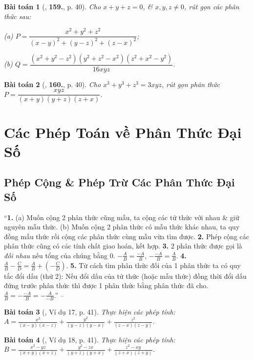 \documentclass{article}
\numberwithin{equation}{section}
\newtheorem{baitoan}{Bài toán}
\begin{document}
\begin{baitoan}[\cite{Tuyen_Toan_8}, \textbf{159.}, p. 40]
	Cho $x + y + z = 0$, \& $x,y,z\ne 0$, rút gọn các phân thức sau:
	
	\begin{enumerate*}
		\item[(a)] $P = \dfrac{x^2 + y^2 + z^2}{(x - y)^2 + (y - z)^2 + (z - x)^2}$;
		\item[(b)] $Q = \dfrac{(x^2 + y^2 - z^2)(y^2 + z^2 - x^2)(z^2 + x^2 - y^2)}{16xyz}$.
	\end{enumerate*}
\end{baitoan}

\begin{baitoan}[\cite{Tuyen_Toan_8}, \textbf{160.}, p. 40]
	Cho $x^3 + y^3 + z^3 = 3xyz$, rút gọn phân thức $P = \dfrac{xyz}{(x + y)(y + z)(z + x)}$.
\end{baitoan}


\section{Các Phép Toán về Phân Thức Đại Số}

\subsection{Phép Cộng \& Phép Trừ Các Phân Thức Đại Số}
``\textbf{1.} (a) Muốn cộng 2 phân thức cũng mẫu, ta cộng các tử thức với nhau \& giữ nguyên mẫu thức. (b) Muốn cộng 2 phân thức có mẫu thức khác nhau, ta quy đồng mẫu thức rồi cộng các phân thức cùng mẫu vừa tìm được. \textbf{2.} Phép cộng các phân thức cũng có các tính chất giao hoán, kết hợp. \textbf{3.} 2 phân thức được gọi là \textit{đối nhau} nếu tổng của chúng bằng 0. $-\frac{A}{B} = \frac{-A}{B}$, $-\frac{-A}{B} = \frac{A}{B}$. \textbf{4.} $\frac{A}{B} - \frac{C}{D} = \frac{A}{B} + \left(-\frac{C}{D}\right)$. \textbf{5.} Từ cách tìm phân thức đối của 1 phân thức ta có quy tắc đổi dấu (thứ 2): Nếu đổi dấu của tử thức (hoặc mẫu thức) đồng thời đổi dấu đứng trước phân thức thì được 1 phân thức bằng phân thức đã cho. $\frac{A}{B} = -\frac{-A}{B} = -\frac{A}{-B}$.'' -- \cite[Chap. 2, \S2, p. 40]{Tuyen_Toan_8}

\begin{baitoan}[\cite{Tuyen_Toan_8}, Ví dụ 17, p. 41]
	Thực hiện các phép tính: $A = \frac{x^2}{(x - y)(x - z)} + \frac{y^2}{(y - z)(y - x)} + \frac{z^2}{(z - x)(z - y)}$.
\end{baitoan}

\begin{baitoan}[\cite{Tuyen_Toan_8}, Ví dụ 18, p. 41]
	Thực hiện các phép tính: $B = \frac{x^2 - yz}{(x + y)(x + z)} + \frac{y^2 - zx}{(y + z)(y + x)} + \frac{z^2 - xy}{(z + x)(z + y)}$.
\end{baitoan}

\printbibliography[heading=bibintoc]
	
\end{document}
